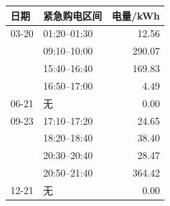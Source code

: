 \begin{tabular}{llr}
\toprule
日期 & 紧急购电区间 & 电量/kWh \\
\midrule
03-20 & 01:20--01:30 & 12.56 \\
 & 09:10--10:00 & 290.07 \\
 & 15:40--16:40 & 169.83 \\
 & 16:50--17:00 & 4.49 \\
06-21 & 无 & 0.00 \\
09-23 & 17:10--17:20 & 24.65 \\
 & 18:20--18:40 & 38.40 \\
 & 20:30--20:40 & 28.47 \\
 & 20:50--21:40 & 364.42 \\
12-21 & 无 & 0.00 \\
\bottomrule
\end{tabular}